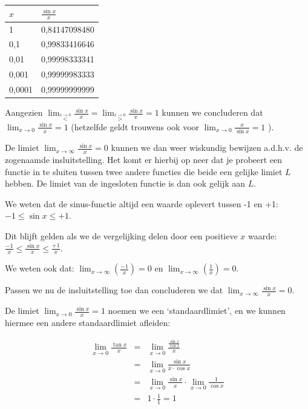 \begin{tabel*}{}
	\centering
	\begin{tabular}{l|l}
		$x$ & $\frac{\sin x}{x}$\\
		\hline 
		1 & 0,84147098480\\
		0,1 & 0,99833416646\\
		0,01 & 0,99998333341\\
		0,001 & 0,99999983333\\
		0,0001 & 0,99999999999\\
	\end{tabular}
\end{tabel*}


Aangezien $\lim_{\overset{x\rightarrow0}{<}}\frac{\sin x}{x}=\lim_{\overset{x\rightarrow0}{>}}\frac{\sin x}{x}=1$
kunnen we concluderen dat $\lim_{x\rightarrow0}\frac{\sin x}{x}=1$
(hetzelfde geldt trouwens ook voor $\lim_{x\rightarrow0}\frac{x}{\sin x}=1$
).


De limiet $\lim_{x\rightarrow\infty}\frac{\sin x}{x}=0$
kunnen we dan weer wiskundig bewijzen a.d.h.v. de zogenaamde insluitstelling.
Het komt er hierbij op neer dat je probeert een functie in te sluiten
tussen twee andere functies die beide een gelijke limiet $L$ hebben.
De limiet van de ingesloten functie is dan ook gelijk aan $L$.

We weten dat de sinus-functie altijd een waarde oplevert
tussen -1 en +1: $-1\leq\sin x\leq+1$.

Dit blijft gelden als we de vergelijking delen door een
positieve $x$ waarde: $\frac{-1}{x}\leq\frac{\sin x}{x}\leq\frac{+1}{x}$.

We weten ook dat: $\lim_{x\to\infty}\left(\frac{-1}{x}\right)=0$
en $\lim_{x\to\infty}\left(\frac{1}{x}\right)=0$.

Passen we nu de insluitstelling toe dan concluderen we dat
$\lim_{x\rightarrow\infty}\frac{\sin x}{x}=0$.


De limiet $\lim_{x\rightarrow0}\frac{\sin x}{x}=1$
noemen we een \textquoteleft standaardlimiet\textquoteright, en we kunnen hiermee een andere standaardlimiet
afleiden:

\begin{eqnarray*}
\lim_{x\rightarrow0}\frac{\tan x}{x}&=&\lim_{x\rightarrow0}\frac{\frac{\sin x}{\cos x}}{x}\\
&=&\lim_{x\rightarrow0}\frac{\sin x}{x\cdot \cos x}\\
&=&\lim_{x\rightarrow0}\frac{\sin x}{x}\cdot \lim_{x\rightarrow0}\frac{1}{\cos x}\\
&=&1\cdot \frac{1}{1}=1
\end{eqnarray*}


